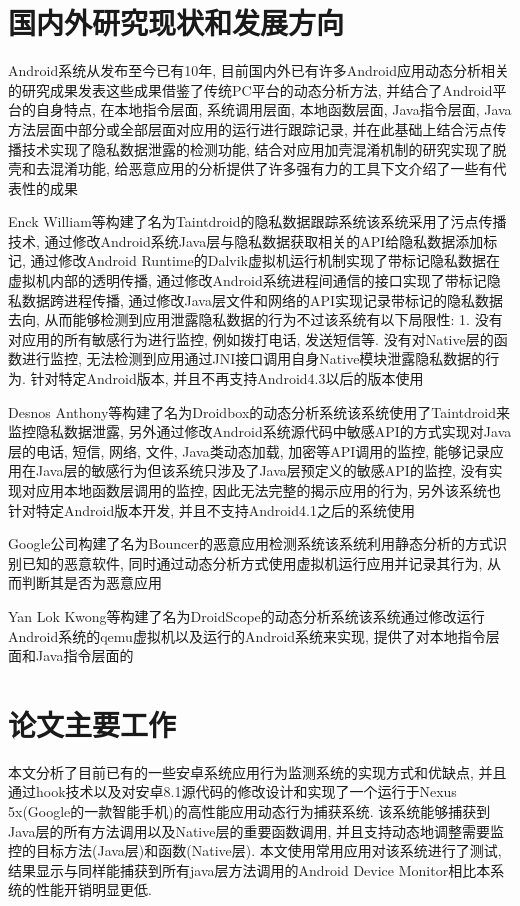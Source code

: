 \section{国内外研究现状和发展方向}
Android系统从发布至今已有10年, 目前国内外已有许多Android应用动态分析相关的研究成果发表\juhao 这些成果借鉴了传统PC平台的动态分析方法, 并结合了Android平台的自身特点, 在本地指令层面, 系统调用层面, 本地函数层面, Java指令层面, Java方法层面中部分或全部层面对应用的运行进行跟踪记录, 并在此基础上结合污点传播技术实现了隐私数据泄露的检测功能, 结合对应用加壳混淆机制的研究实现了脱壳和去混淆功能, 给恶意应用的分析提供了许多强有力的工具\juhao 下文介绍了一些有代表性的成果\juhao

Enck William等构建了名为Taintdroid的隐私数据跟踪系统\juhao 该系统采用了污点传播技术, 通过修改Android系统Java层与隐私数据获取相关的API给隐私数据添加标记, 通过修改Android Runtime的Dalvik虚拟机运行机制实现了带标记隐私数据在虚拟机内部的透明传播, 通过修改Android系统进程间通信的接口实现了带标记隐私数据跨进程传播, 通过修改Java层文件和网络的API实现记录带标记的隐私数据去向, 从而能够检测到应用泄露隐私数据的行为\juhao 不过该系统有以下局限性: 
1. 没有对应用的所有敏感行为进行监控, 例如拨打电话, 发送短信等. 没有对Native层的函数进行监控, 无法检测到应用通过JNI接口调用自身Native模块泄露隐私数据的行为. 针对特定Android版本, 并且不再支持Android4.3以后的版本使用\juhao
 
Desnos Anthony等构建了名为Droidbox的动态分析系统\juhao 该系统使用了Taintdroid来监控隐私数据泄露, 另外通过修改Android系统源代码中敏感API的方式实现对Java层的电话, 短信, 网络, 文件, Java类动态加载, 加密等API调用的监控, 能够记录应用在Java层的敏感行为\juhao 但该系统只涉及了Java层预定义的敏感API的监控, 没有实现对应用本地函数层调用的监控, 因此无法完整的揭示应用的行为, 另外该系统也针对特定Android版本开发, 并且不支持Android4.1之后的系统使用\juhao

Google公司构建了名为Bouncer的恶意应用检测系统\juhao 该系统利用静态分析的方式识别已知的恶意软件, 同时通过动态分析方式使用虚拟机运行应用并记录其行为, 从而判断其是否为恶意应用\juhao

Yan Lok Kwong等构建了名为DroidScope的动态分析系统\juhao 该系统通过修改运行Android系统的qemu虚拟机以及运行的Android系统来实现, 提供了对本地指令层面和Java指令层面的


\section{论文主要工作}
本文分析了目前已有的一些安卓系统应用行为监测系统的实现方式和优缺点, 并且通过hook技术以及对安卓8.1源代码的修改设计和实现了一个运行于Nexus 5x(Google的一款智能手机)的高性能应用动态行为捕获系统. 该系统能够捕获到Java层的所有方法调用以及Native层的重要函数调用, 并且支持动态地调整需要监控的目标方法(Java层)和函数(Native层). 本文使用常用应用对该系统进行了测试, 结果显示与同样能捕获到所有java层方法调用的Android Device Monitor相比本系统的性能开销明显更低.

